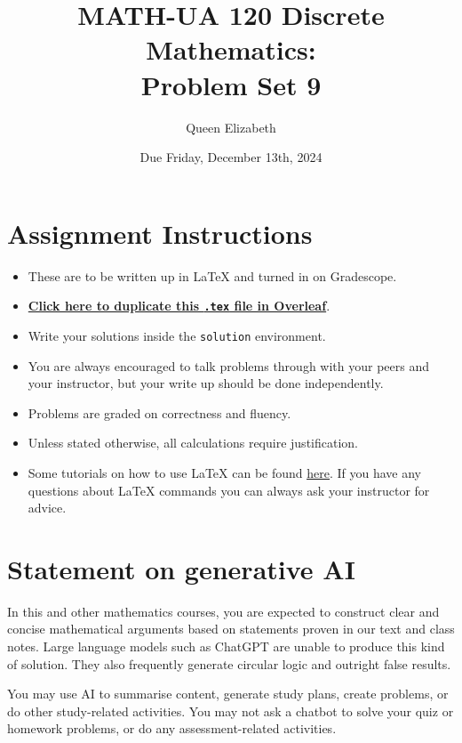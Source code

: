 \documentclass{article}
\title{\textbf{MATH-UA 120 Discrete Mathematics: \\ Problem Set 9}}
\author{%
    Queen Elizabeth %
}
\date{Due Friday, December 13th, 2024} %
\theoremstyle{definition}
\begin{document}
\maketitle %

\vfill

\section*{Assignment Instructions}

\begin{itemize}
    \item These are to be written up in \LaTeX{} and turned in on Gradescope.
    \item \href{https://bit.ly/3yZ1C7Q}{\textbf{Click here to duplicate this \texttt{.tex} file in Overleaf}}.
    \item Write your solutions inside the \texttt{solution} environment.
    \item You are always encouraged to talk problems through with your peers and your instructor, but your write up should be done independently.
    \item Problems are graded on correctness and fluency.
    \item Unless stated otherwise, all calculations require justification.
    \item Some tutorials on how to use \LaTeX{} can be found \href{https://www.overleaf.com/learn/latex/Tutorials}{\underline{here}}. If you have any questions about \LaTeX{} commands you can always ask your instructor for advice.
\end{itemize}

\vfill

\section*{Statement on generative AI}

In this and other mathematics courses, you are expected to construct clear and concise mathematical arguments based on statements proven in our text and class notes. Large language models such as ChatGPT are unable to produce this kind of solution. They also frequently generate circular logic and outright false results.
 
You may use AI to summarise content, generate study plans, create problems, or do other study-related activities. You may not ask a chatbot to solve your quiz or homework problems, or do any assessment-related activities.
 
\end{document}
